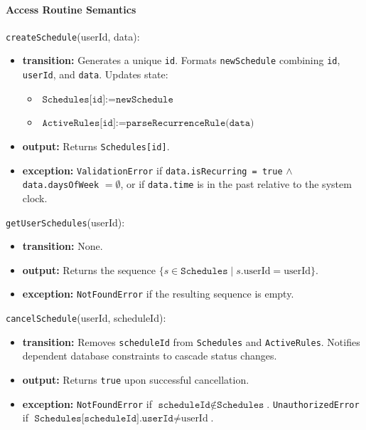 \paragraph{Access Routine Semantics}

\texttt{createSchedule}(userId, data):
\begin{itemize}
    \item \textbf{transition:} Generates a unique \texttt{id}. Formats \texttt{newSchedule} combining \texttt{id}, \texttt{userId}, and \texttt{data}. Updates state: 
    \begin{itemize}
        \item $\texttt{Schedules[id]} := \texttt{newSchedule}$
        \item $\texttt{ActiveRules[id]} := \texttt{parseRecurrenceRule(data)}$
    \end{itemize}
    \item \textbf{output:} Returns \texttt{Schedules[id]}.
    \item \textbf{exception:} \texttt{ValidationError} if \texttt{data.isRecurring = true} $\land$ \texttt{data.daysOfWeek} $= \emptyset$, or if \texttt{data.time} is in the past relative to the system clock.
\end{itemize}

\texttt{getUserSchedules}(userId):
\begin{itemize}
    \item \textbf{transition:} None.
    \item \textbf{output:} Returns the sequence $\{s \in \texttt{Schedules} \mid s.\text{userId} = \text{userId}\}$.
    \item \textbf{exception:} \texttt{NotFoundError} if the resulting sequence is empty.
\end{itemize}

\texttt{cancelSchedule}(userId, scheduleId):
\begin{itemize}
    \item \textbf{transition:} Removes \texttt{scheduleId} from \texttt{Schedules} and \texttt{ActiveRules}. Notifies dependent database constraints to cascade status changes.
    \item \textbf{output:} Returns \texttt{true} upon successful cancellation.
    \item \textbf{exception:} \texttt{NotFoundError} if $\texttt{scheduleId} \notin \texttt{Schedules}$. \texttt{UnauthorizedError} if $\texttt{Schedules[scheduleId].userId} \neq \text{userId}$.
\end{itemize}

